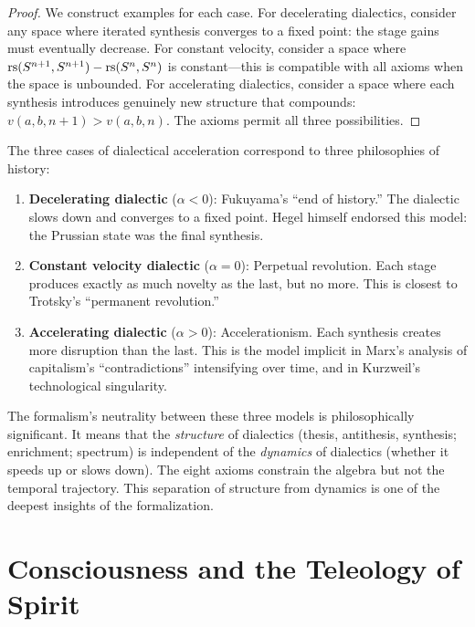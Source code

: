 \begin{proof}
We construct examples for each case. For decelerating dialectics, consider
any space where iterated synthesis converges to a fixed point: the stage gains
must eventually decrease. For constant velocity, consider a space where
$\mathrm{rs}(S^{n+1}, S^{n+1}) - \mathrm{rs}(S^n, S^n)$ is constant---this is compatible
with all axioms when the space is unbounded. For accelerating dialectics,
consider a space where each synthesis introduces genuinely new structure
that compounds: $v(a,b,n+1) > v(a,b,n)$. The axioms permit all three
possibilities.
\end{proof}

\begin{interpretation}
The three cases of dialectical acceleration correspond to three philosophies
of history:

\begin{enumerate}
\item \textbf{Decelerating dialectic} ($\alpha < 0$): Fukuyama's ``end of
history.'' The dialectic slows down and converges to a fixed point. Hegel
himself endorsed this model: the Prussian state was the final synthesis.
\item \textbf{Constant velocity dialectic} ($\alpha = 0$): Perpetual
revolution. Each stage produces exactly as much novelty as the last, but
no more. This is closest to Trotsky's ``permanent revolution.''
\item \textbf{Accelerating dialectic} ($\alpha > 0$): Accelerationism. Each
synthesis creates more disruption than the last. This is the model implicit
in Marx's analysis of capitalism's ``contradictions'' intensifying over time,
and in Kurzweil's technological singularity.
\end{enumerate}

The formalism's neutrality between these three models is philosophically
significant. It means that the \emph{structure} of dialectics (thesis,
antithesis, synthesis; enrichment; spectrum) is independent of the
\emph{dynamics} of dialectics (whether it speeds up or slows down). The
eight axioms constrain the algebra but not the temporal trajectory.
This separation of structure from dynamics is one of the deepest insights
of the formalization.
\end{interpretation}

\section{Consciousness and the Teleology of Spirit}
\label{sec:consciousness-teleology}

